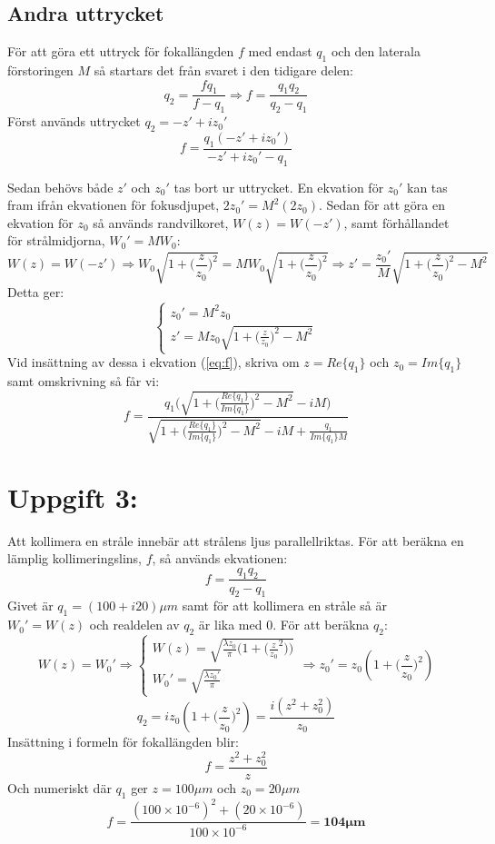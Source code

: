 \documentclass{article}
\begin{document}
  \subsection*{Andra uttrycket}
    För att göra ett uttryck för fokallängden $f$ med endast $q_1$ och den laterala förstoringen $M$ så startars det från svaret i den tidigare delen:
    \[
      q_2=\frac{fq_1}{f-q_1}\Longrightarrow f=\frac{q_1q_2}{q_2-q_1}
    \]
    Först används uttrycket $q_2=-z'+iz_0'$
    \begin{equation}
      f=\frac{q_1(-z'+iz_0')}{-z'+iz_0'-q_1}
      \label{eq:f}
    \end{equation}

    Sedan behövs både $z'$ och $z_0'$ tas bort ur uttrycket. En ekvation för $z_0'$ kan tas fram ifrån ekvationen för fokusdjupet, $2z_0'=M^2(2z_0)$. Sedan för att göra en ekvation för $z_0$ så används randvilkoret, $W(z)=W(-z')$, samt förhållandet för strålmidjorna, $W_0'=MW_0$:
    \[
      W(z)=W(-z')\Rightarrow W_0\sqrt{1+\big(\frac{z}{z_0}\big)^2}=MW_0\sqrt{1+\big(\frac{z}{z_0}\big)^2}\Rightarrow z'=\frac{z_0'}{M}\sqrt{1+\big(\frac{z}{z_0}\big)^2-M^2}
    \]
    Detta ger:
    \[
      \begin{cases}
        z_0'=M^2z_0\\
        z'=Mz_0\sqrt{1+\big(\frac{z}{z_0}\big)^2-M^2}
      \end{cases}
    \]
    Vid insättning av dessa i ekvation (\ref{eq:f}), skriva om $z=Re\{q_1\}$ och $z_0=Im\{q_1\}$ samt omskrivning så får vi:
    \[
      f=\frac{q_1\big(\sqrt{1+\big(\frac{Re\{q_1\}}{Im\{q_1\}}\big)^2-M^2}-iM\big)}{\sqrt{1+\big(\frac{Re\{q_1\}}{Im\{q_1\}}\big)^2-M^2}-iM+\frac{q_1}{Im\{q_1\}M}}
    \]

\newpage
\section*{Uppgift 3:}
  Att kollimera en stråle innebär att strålens ljus parallellriktas. För att beräkna en lämplig kollimeringslins, $f$, så används ekvationen:
  \[
    f=\frac{q_1q_2}{q_2-q_1}
  \]
  Givet är $q_1=(100+i20)\mu m$ samt för att kollimera en stråle så är $W_0'=W(z)$ och realdelen av $q_2$ är lika med $0$. För att beräkna $q_2$:
  \[
    W(z)=W_0'\Rightarrow
    \begin{cases}
      W(z)=\sqrt{\frac{\lambda z_0}{\pi}\bigg(1+\big(\frac{z}{z_0}^2\big)\bigg)}\\
      W_0'=\sqrt{\frac{\lambda z_0'}{\pi}}
    \end{cases}
    \Rightarrow z_0'=z_0(1+\big(\frac{z}{z_0}\big)^2)
  \]
  \[
    q_2=iz_0(1+\big(\frac{z}{z_0}\big)^2)=\frac{i(z^2+z_0^2)}{z_0}
  \]
  Insättning i formeln för fokallängden blir:
  \[
    f=\frac{z^2+z_0^2}{z}
  \]
  Och numeriskt där $q_1$ ger $z=100\mu m$ och $z_0=20\mu m$
  \[
    f=\frac{(100\times10^{-6})^2+(20\times10^{-6})}{100\times10^{-6}}=\mathbf{104\mu m}
  \]
\end{document}
